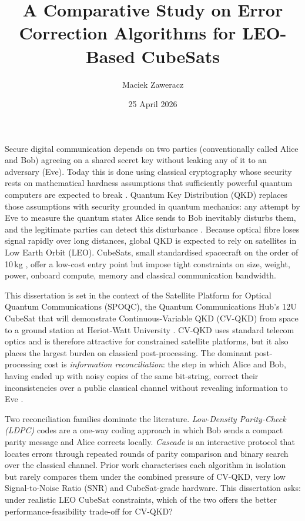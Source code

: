 \documentclass{UoYCSproject}
\author{Maciek Zaweracz}
\title{A Comparative Study on Error Correction Algorithms for LEO-Based CubeSats}
\date{25 April 2026}
\begin{document}
\maketitle
\listoffigures
\listoftables

\begin{summary}

Secure digital communication depends on two parties (conventionally
called Alice and Bob) agreeing on a shared secret key without
leaking any of it to an adversary (Eve). Today this is done using
classical cryptography whose security rests on mathematical hardness
assumptions that sufficiently powerful quantum computers are expected
to break \cite{WRIGHT200013}. Quantum Key Distribution (QKD) replaces those assumptions
with security grounded in quantum mechanics: any attempt by Eve to
measure the quantum states Alice sends to Bob inevitably disturbs
them, and the legitimate parties can detect this disturbance
\cite{grosshans_continuous_2002, laudenbach_continuous-variable_2018}.
Because optical fibre loses signal rapidly over long distances, global
QKD is expected to rely on satellites in Low Earth Orbit (LEO).
CubeSats, small standardised spacecraft on the order of 10\,kg
\cite{oi_cubesat_2017}, offer a low-cost entry point but impose
tight constraints on size, weight, power, onboard compute, memory and
classical communication bandwidth.

This dissertation is set in the context of the Satellite Platform for
Optical Quantum Communications (SPOQC), the Quantum Communications
Hub's 12U CubeSat that will demonstrate Continuous-Variable QKD
(CV-QKD) from space to a ground station at Heriot-Watt University
\cite{noauthor_hubs_nodate, simmons_hogs_2025}. CV-QKD uses standard 
telecom optics and is therefore attractive for constrained
satellite platforms, but it also places the largest
burden on classical post-processing. The dominant post-processing cost
is \textit{information reconciliation}: the step in which Alice and
Bob, having ended up with noisy copies of the same bit-string,
correct their inconsistencies over a public classical channel without
revealing information to Eve \cite{mueller_performance_2025}. 

Two
reconciliation families dominate the literature. \textit{Low-Density
Parity-Check (LDPC)} codes are a one-way coding approach in which Bob
sends a compact parity message and Alice corrects locally.
\textit{Cascade} is an interactive protocol that locates errors
through repeated rounds of parity comparison and binary search over
the classical channel. Prior work characterises each algorithm in
isolation but rarely compares them under the combined pressure of
CV-QKD, very low Signal-to-Noise Ratio (SNR) and CubeSat-grade
hardware. This dissertation asks: under realistic LEO CubeSat
constraints, which of the two offers the better
performance-feasibility trade-off for CV-QKD?


\end{summary}
\end{document}
